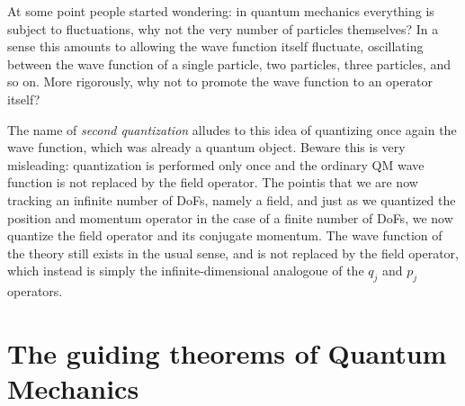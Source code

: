\documentclass[../QFT_main.tex]{subfiles}
\begin{document}
\begin{mytheorem}
At some point people started wondering: in quantum mechanics everything is subject to fluctuations, why not the very number of particles themselves? 
In a sense this amounts to allowing the wave function itself fluctuate, oscillating between the wave function of a single particle, two particles, three particles, and so on.
More rigorously, why not to promote the wave function to an operator itself? 

The name of \emph{second quantization} alludes to this idea of quantizing once again the wave function, which was already a quantum object.
Beware this is very misleading: quantization is performed only once and the ordinary QM wave function is not replaced by the field operator.
The pointis that we are now tracking an infinite number of DoFs, namely a field, and just as we quantized the position and momentum operator in the case of a finite number of DoFs, we now quantize the field operator and its conjugate momentum.
The wave function of the theory still exists in the usual sense, and is not replaced by the field operator, which instead is simply the infinite-dimensional analogoue of the $q_j$ and $p_j$ operators.
\end{mytheorem}






\section{The guiding theorems of Quantum Mechanics} 
\label{sec:guiding_theorems}
\end{document}
